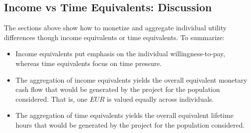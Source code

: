 \subsection{Income vs Time Equivalents: Discussion}
\label{ch:economicEval:aggregatingValues:discussion:incVsTime}
The sections above show how to monetize and aggregate individual utility differences though income equivalents or time equivalents. To summarize:
%
\begin{itemize}\styleItemize
%
\item Income equivalents put emphasis on the individual willingness-to-pay, whereas time equivalents focus on time pressure.
%
\item The aggregation of income equivalents yields the overall
%
%
equivalent monetary cash flow that would be generated by the project for the population considered.
%
That is, one $\mathit{EUR}$ is valued equally across individuals.
%
\item The aggregation of time equivalents yields the overall 
%
%
%
equivalent lifetime hours that would be generated by the project for the population considered.
%

\end{itemize}
